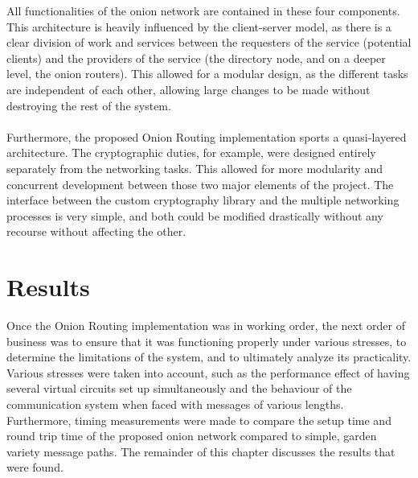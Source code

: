 \documentclass[10pt]{report}
\begin{document}
All functionalities of the onion network are contained in these four components. This architecture
is heavily influenced by the client-server model, as there is a clear division of work and services
between the requesters of the service (potential clients) and the providers of the service (the
directory node, and on a deeper level, the onion routers). This allowed for a modular design, as the
different tasks are independent of each other, allowing large changes to be made without destroying
the rest of the system.\\\\
Furthermore, the proposed Onion Routing implementation sports a quasi-layered architecture. The
cryptographic duties, for example, were designed entirely separately from the networking tasks. This
allowed for more modularity and concurrent development between those two major elements of the
project. The interface between the custom cryptography library and the multiple networking processes
is very simple, and both could be modified drastically without any recourse without affecting the
other.

\chapter{Results}
Once the Onion Routing implementation was in working order, the next order of business was to ensure
that it was functioning properly under various stresses, to determine the limitations of the system,
and to ultimately analyze its practicality. Various stresses were taken into account, such as the
performance effect of having several virtual circuits set up simultaneously and the behaviour of the
communication system when faced with messages of various lengths. Furthermore, timing measurements
were made to compare the setup time and round trip time of the proposed onion network compared to
simple, garden variety message paths. The remainder of this chapter discusses the results that were
found.
\end{document}
